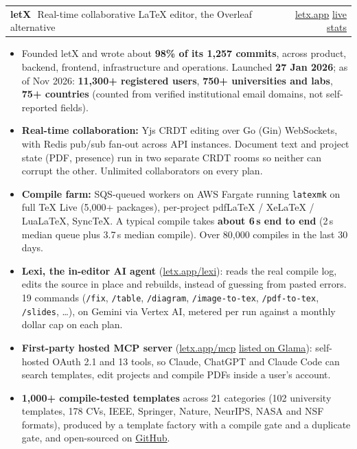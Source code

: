\documentclass[10pt,a4paper]{article}
\makeatletter
\newcommand{\lxUsers}{11,300+}
\newcommand{\lxInstitutions}{750+}
\newcommand{\lxCountries}{75+}
\newcommand{\lxTemplates}{1,000+}
\newcommand{\lxCompiles}{80,000}
\newcommand{\lxAsOf}{Nov 2026}
\newcommand{\lnk}[2]{\href{#1}{\color{accent}#2}}
\newcommand{\proj}[3]{%
  \vspace{5pt}%
  \begin{tabularx}{\linewidth}{@{}X r@{}}
    {\sffamily\bfseries #1}\,{\small\color{muted}\textbar\ #2} & \small #3
  \end{tabularx}\par\vspace{-1pt}}
\newcommand{\sep}{\unskip\enspace{\color{muted}\textbar}\enspace\ignorespaces}
\makeatother
\begin{document}
\proj{letX}{Real-time collaborative LaTeX editor, the Overleaf alternative}%
  {\lnk{https://letx.app}{letx.app} \sep \lnk{https://letx.app/stats/}{live stats}}
\begin{itemize}
  \item Founded letX and wrote about \textbf{98\% of its 1,257 commits}, across product, backend, frontend, infrastructure
        and operations. Launched \textbf{27 Jan 2026}; as of \lxAsOf{}:
        \textbf{\lxUsers{} registered users}, \textbf{\lxInstitutions{} universities and labs}, \textbf{\lxCountries{} countries}
        (counted from verified institutional email domains, not self-reported fields).
  \item \textbf{Real-time collaboration:} Yjs CRDT editing over Go (Gin) WebSockets, with Redis pub/sub fan-out across
        API instances. Document text and project state (PDF, presence) run in two separate CRDT rooms so neither can corrupt
        the other. Unlimited collaborators on every plan.
  \item \textbf{Compile farm:} SQS-queued workers on AWS Fargate running \texttt{latexmk} on full TeX Live (5,000+ packages),
        per-project pdfLaTeX / XeLaTeX / LuaLaTeX, SyncTeX. A typical compile takes \textbf{about 6\,s end to end}
        (2\,s median queue plus 3.7\,s median compile). Over \lxCompiles{} compiles in the last 30 days.
  \item \textbf{Lexi, the in-editor AI agent} (\lnk{https://letx.app/lexi/}{letx.app/lexi}): reads the real compile log,
        edits the source in place and rebuilds, instead of guessing from pasted errors. 19 commands
        (\texttt{/fix}, \texttt{/table}, \texttt{/diagram}, \texttt{/image-to-tex}, \texttt{/pdf-to-tex}, \texttt{/slides}, \dots),
        on Gemini via Vertex AI, metered per run against a monthly dollar cap on each plan.
  \item \textbf{First-party hosted MCP server} (\lnk{https://letx.app/mcp/}{letx.app/mcp} \sep
        \lnk{https://glama.ai/mcp/connectors/app.letx/letx}{listed on Glama}): self-hosted OAuth 2.1 and 13 tools, so Claude,
        ChatGPT and Claude Code can search templates, edit projects and compile PDFs inside a user's account.
  \item \textbf{\lxTemplates{} compile-tested templates} across 21 categories (102 university templates, 178 CVs, IEEE, Springer,
        Nature, NeurIPS, NASA and NSF formats), produced by a template factory with a compile gate and a duplicate gate,
        and open-sourced on \lnk{https://github.com/Shahriar-Labs/latex-templates}{GitHub}.

\end{itemize}
\end{document}
